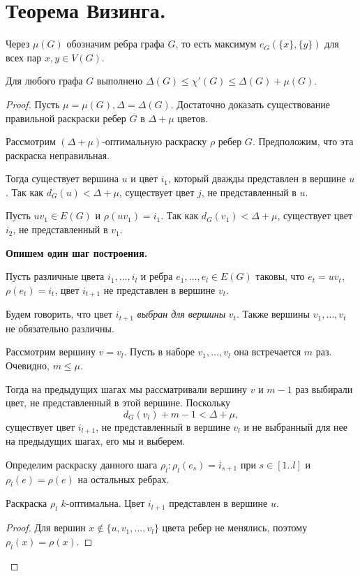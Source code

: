 \section{Теорема Визинга.}
\begin{definition}
    Через $\mu(G)$ обозначим  ребра графа $G$, то есть максимум $e_G(\{x\}, \{y\})$ для всех пар $x, y \in V(G)$.
\end{definition}
\begin{theorem}[Визинг, 1964]
    Для любого графа $G$ выполнено $\Delta(G) \le \chi'(G) \le \Delta(G) + \mu(G)$.
\end{theorem}
\begin{proof}
    Пусть $\mu = \mu(G), \Delta= \Delta(G)$. Достаточно доказать существование правильной раскраски ребер $G$ в  $\Delta + \mu$ цветов.

	Рассмотрим $(\Delta+\mu)$-оптимальную раскраску $\rho$ ребер $G$.
	Предположим, что эта раскраска неправильная.

	Тогда существует вершина $u$ и цвет $ i_1$, который дважды представлен в вершине $u$. Так как $d_{G}(u) < \Delta + \mu$, существует цвет $j$, не представленный в $u$.

	Пусть $uv_1 \in E(G)$ и $\rho(uv_1) = i_1$. Так как $d_G(v_1) < \Delta + \mu$, существует цвет $i_2$, не представленный в $v_1$.
	
	{\bf  Опишем один шаг построения. }

	Пусть различные цвета $i_1, \ldots , i_l $ и ребра $e_1, \ldots , e_l \in E(G)$ таковы, что $e_t = uv_t$, $\rho(e_t) = i_t$, цвет $i_{t+1}$ не представлен в вершине $v_t$.

	Будем говорить, что цвет $i_{t+1}$ \textit{выбран для вершины} $v_t$. Также вершины $v_1, \ldots , v_t $ не обязательно различны.

	Рассмотрим вершину $v = v_l$. Пусть в наборе $v_1, \ldots , v_l $ она встречается $m$ раз. Очевидно, $m \le \mu$.
	
	Тогда на предыдущих шагах мы рассматривали вершину $v$ и $m-1$ раз выбирали цвет, не представленный в этой вершине. Поскольку \[
	d_G(v_l) + m - 1 < \Delta + \mu
	,\] 
	существует цвет $i_{l+1}$, не представленный в вершине $v_l$ и не выбранный для нее на предыдущих шагах, его мы и выберем.

	Определим раскраску данного шага $\rho_l\colon \rho_l(e_s) = i_{s+1}$ при $s \in [1..l]$ и $\rho_l(e) = \rho(e)$ на остальных ребрах.
	\begin{statement}
	    Раскраска $\rho_l$ $k$-оптимальна. Цвет $i_{l+1}$ представлен в вершине $u$.
	\end{statement}
	\begin{proof}
	    Для вершин $x \notin \{u, v_1, \ldots , v_l\}$ цвета ребер не менялись, поэтому $\rho_l(x) = \rho(x)$.


\end{proof}
\end{proof}
